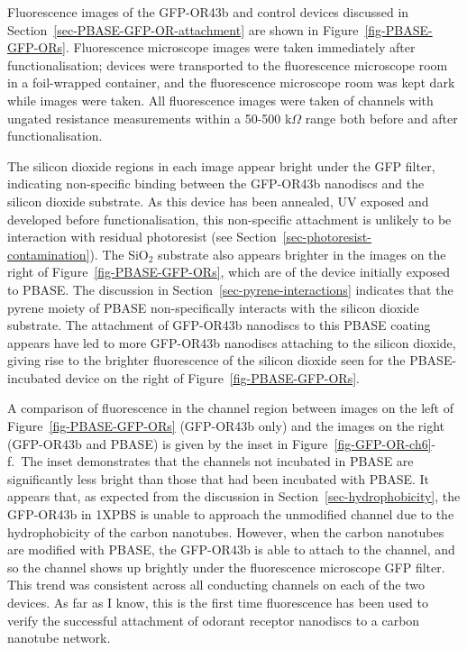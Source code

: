\documentclass[
  a4paper,
]{scrbook}
\begin{document}
Fluorescence images of the GFP-OR43b and control devices discussed in
Section~\ref{sec-PBASE-GFP-OR-attachment} are shown in
Figure~\ref{fig-PBASE-GFP-ORs}. Fluorescence microscope images were
taken immediately after functionalisation; devices were transported to
the fluorescence microscope room in a foil-wrapped container, and the
fluorescence microscope room was kept dark while images were taken. All
fluorescence images were taken of channels with ungated resistance
measurements within a 50-500 k\(\Omega\) range both before and after
functionalisation.

The silicon dioxide regions in each image appear bright under the GFP
filter, indicating non-specific binding between the GFP-OR43b nanodiscs
and the silicon dioxide substrate. As this device has been annealed, UV
exposed and developed before functionalisation, this non-specific
attachment is unlikely to be interaction with residual photoresist (see
Section~\ref{sec-photoresist-contamination}). The SiO\(_2\) substrate
also appears brighter in the images on the right of
Figure~\ref{fig-PBASE-GFP-ORs}, which are of the device initially
exposed to PBASE. The discussion in
Section~\ref{sec-pyrene-interactions} indicates that the pyrene moiety
of PBASE non-specifically interacts with the silicon dioxide substrate.
The attachment of GFP-OR43b nanodiscs to this PBASE coating appears have
led to more GFP-OR43b nanodiscs attaching to the silicon dioxide, giving
rise to the brighter fluorescence of the silicon dioxide seen for the
PBASE-incubated device on the right of Figure~\ref{fig-PBASE-GFP-ORs}.

A comparison of fluorescence in the channel region between images on the
left of Figure~\ref{fig-PBASE-GFP-ORs} (GFP-OR43b only) and the images
on the right (GFP-OR43b and PBASE) is given by the inset in
Figure~\ref{fig-GFP-OR-ch6}-f.~The inset demonstrates that the channels
not incubated in PBASE are significantly less bright than those that had
been incubated with PBASE. It appears that, as expected from the
discussion in Section~\ref{sec-hydrophobicity}, the GFP-OR43b in 1XPBS
is unable to approach the unmodified channel due to the hydrophobicity
of the carbon nanotubes. However, when the carbon nanotubes are modified
with PBASE, the GFP-OR43b is able to attach to the channel, and so the
channel shows up brightly under the fluorescence microscope GFP filter.
This trend was consistent across all conducting channels on each of the
two devices. As far as I know, this is the first time fluorescence has
been used to verify the successful attachment of odorant receptor
nanodiscs to a carbon nanotube network.
\end{document}
